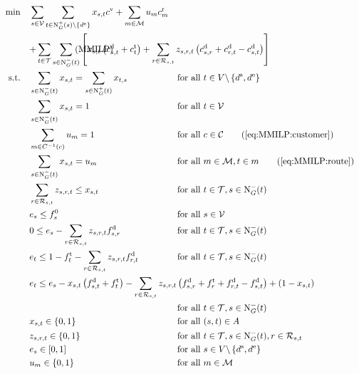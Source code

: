 \begin{align}
	\min \quad & \sum_{s\in\mathcal{V}} \sum_{t\in\Nout(s)\backslash\{d^{\operatorname{e}}\}} x_{s,t}\cv + \sum_{m\in\mathcal{M}} u_m \croute_m \nonumber \\
	& \omit\rlap{$\displaystyle{ + \sum_{t\in\mathcal{T}} \sum_{s\in\Nin(t)} \left[x_{s,t}\left(\cd_{s,t}+\ct_{t}\right) + \sum_{r\in\Rst} z_{s,r,t}\left(\cd_{s,r}+\cd_{r,t}-\cd_{s,t}\right)\right]}$} \tag{$\operatorname{MMILP}$} \label{eq:MMILP} \\
	\text{s.t.} \quad & \sum_{s\in\Nin(t)} x_{s,t} = \sum_{s\in\Nout(t)} x_{t,s} & & \text{for all } t\in V\backslash\left\{d^{\operatorname{s}},d^{\operatorname{e}}\right\} \label{eq:MMILP:flow} \\
	& \sum_{s\in\Nin(t)} x_{s,t} = 1 & & \text{for all } t\in\mathcal{V} \label{eq:MMILP:vehicles} \\
	& \sum_{m\in C^{-1}(c)} u_m = 1 && \text{for all } c\in\mathcal{C} \tag{\ref{eq:MMILP:customer}} \\
	& \sum_{s\in\Nin(t)} x_{s,t} = u_m && \text{for all } m\in\mathcal{M}, t\in m \tag{\ref{eq:MMILP:route}} \\
	& \sum_{r\in\Rst} z_{s,r,t} \leq x_{s,t} & & \text{for all } t\in\mathcal{T}, s\in\Nin(t) \label{eq:MMILP:refuel} \\
	& e_s \leq f_s^0 & & \text{for all } s\in\mathcal{V} \label{eq:MMILP:initial_fuel} \\
	& 0 \leq e_s - \sum_{r\in\Rst} z_{s,r,t}\fd_{s,r} & & \text{for all } t\in\mathcal{T}, s\in\Nin(t) \label{eq:MMILP:min_fuel} \\
	& e_t \leq 1 - \ft_t - \sum_{r\in\Rst} z_{s,r,t}\fd_{r,t} & & \text{for all } t\in\mathcal{T}, s\in\Nin(t) \label{eq:MMILP:max_fuel} \\
	& \omit\rlap{$\displaystyle{e_t \leq e_s - x_{s,t}\left(f_{s,t}^{\operatorname{d}}+f_t^{\operatorname{t}}\right) - \sum_{r\in\Rst} z_{s,r,t}\left(\fd_{s,r}+\ft_r+\fd_{r,t}-\fd_{s,t}\right) + \left(1-x_{s,t}\right)}$} \nonumber \\
	& & & \text{for all } t\in\mathcal{T}, s\in\Nin(t) \label{eq:MMILP:fuel_consumption} \\
	& x_{s,t}\in\{0,1\} & & \text{for all } (s,t)\in A \label{eq:MMILP:xst} \\
	& z_{s,r,t}\in\{0,1\} & & \text{for all } t\in\mathcal{T},s\in\Nin(t),r\in\Rst \label{eq:MMILP:zsrt} \\
	& e_s\in[0,1] & & \text{for all } s\in V\backslash\left\{d^{\operatorname{s}},d^{\operatorname{e}}\right\} \label{eq:MMILP:es} \\
	& u_m\in\{0,1\} && \text{for all } m\in\mathcal{M} \label{eq:MMILP:um}
\end{align}

